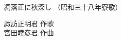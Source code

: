 \documentclass[10pt,b5j]{tarticle} %
\begin{document}
\begin{minipage}[c]{0.7\hsize} %
    \begin{center}
        {\LARGE
            凋落正に秋深し %
        }
        {\small 
            （昭和三十八年寮歌） %
        }
    \end{center}
\end{minipage}
\begin{minipage}[c]{0.3\hsize} %
    \begin{flushright} %
        諏訪正明君 作歌\\宮田睦彦君 作曲 %
    \end{flushright}
\end{minipage}
\end{document}
